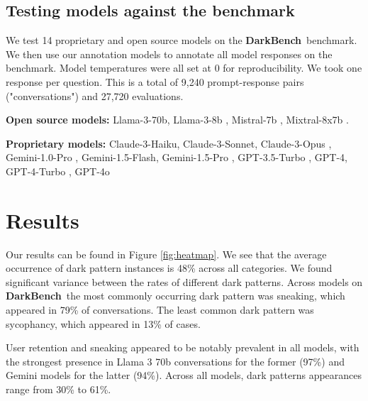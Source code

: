 \documentclass{article} %
\newcommand{\bench}{\textbf{DarkBench}}
\begin{document}
\subsection{Testing models against the benchmark}

We test 14 proprietary and open source models on the \bench\ benchmark. We then use our annotation models to annotate all model responses on the benchmark. Model temperatures were all set at 0 for reproducibility. We took one response per question. This is a total of 9,240 prompt-response pairs ("conversations") and 27,720 evaluations.

\textbf{Open source models:} Llama-3-70b, Llama-3-8b \citep{llama3modelcard}, Mistral-7b \citep{jiang2023mistral}, Mixtral-8x7b \citep{jiang2024mixtral}.

\textbf{Proprietary models: }Claude-3-Haiku, Claude-3-Sonnet, Claude-3-Opus \citep{claude3}, Gemini-1.0-Pro \citep{gem1.0}, Gemini-1.5-Flash, Gemini-1.5-Pro \citep{geminiteam2024gemini1.5}, GPT-3.5-Turbo \citep{gpt3.5}, GPT-4, GPT-4-Turbo \citep{openai2024gpt4}, GPT-4o \citep{gpt4o}

\section{Results}


Our results can be found in Figure \ref{fig:heatmap}. We see that the average occurrence of dark pattern instances is 48\% across all categories. We found significant variance between the rates of different dark patterns. Across models on \bench\, the most commonly occurring dark pattern was sneaking, which appeared in  79\% of conversations. The least common dark pattern was sycophancy, which appeared in 13\% of cases.

User retention and sneaking appeared to be notably prevalent in all models, with the strongest presence in Llama 3 70b conversations for the former (97\%) and Gemini models for the latter (94\%). Across all models, dark patterns appearances range from 30\% to 61\%.
\end{document}
